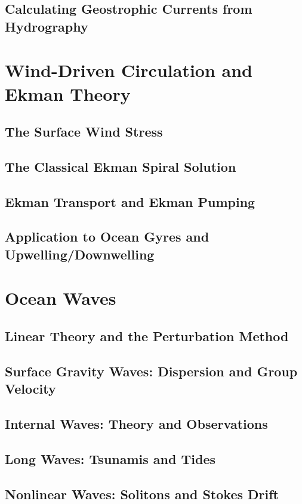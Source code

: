 \documentclass[12pt]{book}
\begin{document}
\section{Calculating Geostrophic Currents from Hydrography}

\chapter{Wind-Driven Circulation and Ekman Theory}
\section{The Surface Wind Stress}
\section{The Classical Ekman Spiral Solution}
\section{Ekman Transport and Ekman Pumping}
\section{Application to Ocean Gyres and Upwelling/Downwelling}

\chapter{Ocean Waves}
\section{Linear Theory and the Perturbation Method}
\section{Surface Gravity Waves: Dispersion and Group Velocity}
\section{Internal Waves: Theory and Observations}
\section{Long Waves: Tsunamis and Tides}
\section{Nonlinear Waves: Solitons and Stokes Drift}
\end{document}
